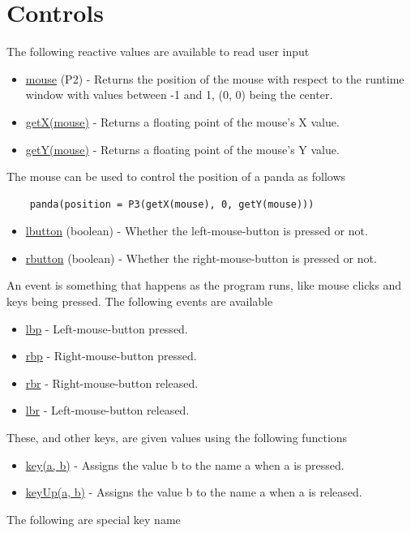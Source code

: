 \documentclass[10pt]{article}
\begin{document}
\section*{Controls}
The following reactive values are available to read user input
\begin{itemize}
    \item \underline{mouse} (P2) - Returns the position of the mouse with respect to the runtime window with values between -1 and 1, (0, 0) being the center.
    \item \underline{getX(mouse)} - Returns a floating point of the mouse's X value.
    \item \underline{getY(mouse)} - Returns a floating point of the mouse's Y value.
\end{itemize}
The mouse can be used to control the position of a panda as follows
\begin{lstlisting}
    panda(position = P3(getX(mouse), 0, getY(mouse)))
\end{lstlisting}
\begin{itemize}
    \item \underline{lbutton} (boolean) - Whether the left-mouse-button is pressed or not.
    \item \underline{rbutton} (boolean) - Whether the right-mouse-button is pressed or not.
\end{itemize}
An event is something that happens as the program runs, like mouse clicks and keys being pressed.
The following events are available
\begin{itemize}
    \item \underline{lbp} - Left-mouse-button pressed.
    \item \underline{rbp} - Right-mouse-button pressed.
    \item \underline{rbr} - Right-mouse-button released.
    \item \underline{lbr} - Left-mouse-button released.
\end{itemize}
These, and other keys, are given values using the following functions
\begin{itemize}
    \item \underline{key(a, b)} - Assigns the value b to the name a when a is pressed.
    \item \underline{keyUp(a, b)} - Assigns the value b to the name a when a is released.
\end{itemize}
The following are special key name
\end{document}

